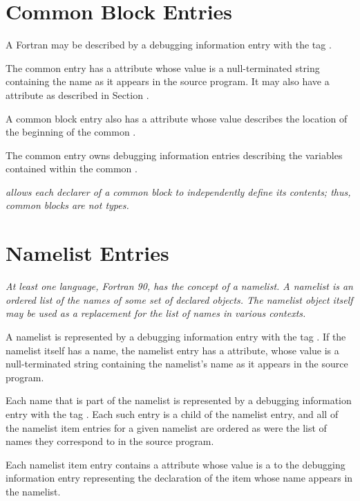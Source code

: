 \section{Common Block Entries}
\label{chap:commonblockentries}
A Fortran 
may 
be described by a debugging information entry with the 
tag \DWTAGcommonblockTARG. 

The common  
entry has a \DWATname{} attribute 
whose value is a null-terminated
string containing the
name as it appears in the source program. It may also have a
\DWATlinkagename{} attribute as described in 
Section . 

A common block entry also has a \DWATlocation{} attribute
whose value describes the
location of the beginning of the common . 

The common
 entry owns debugging information entries describing
the variables contained within the common .

\textit{ allows each declarer of a common block 
to independently define its contents; thus, common blocks are not types.}

\section{Namelist Entries}
\label{chap:namelistentries}
\textit{At least one language, Fortran 90, has the concept of a
namelist. A namelist is an ordered list of the names of some
set of declared objects. The namelist object itself may be used
as a replacement for the list of names in various contexts.}

A namelist is represented by a debugging information entry
with the 
tag \DWTAGnamelistTARG. 
If the namelist itself has a
name, the namelist entry has a \DWATname{} attribute,
whose value is a null-terminated
string containing the namelist\textquoteright{}s
name as it appears in the source program.

Each 
\hypertarget{chap:DWATnamelistitemnamelistitem}{}
name that is part of the namelist is represented
by a debugging information entry with the tag
\DWTAGnamelistitemTARG. 
Each such entry is a child of the
namelist entry, and all of the 
namelist item entries for a
given namelist are ordered as were the list of names they
correspond to in the source program.

Each namelist item entry contains a 
\DWATnamelistitem{} attribute
whose 
value is a  to the debugging
information entry representing the declaration of the item
whose name appears in the namelist.


